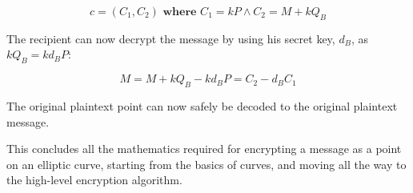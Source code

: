\begin{equation}
	c = (C_1, C_2)  \textbf{ where }  C_1 = kP \land C_2 = M+kQ_B
\end{equation}

The recipient can now decrypt the message by using his secret key, \(d_B\), as \(kQ_B = kd_BP\):

\begin{equation}
	M = M + k Q_B - k d_B P = C_2 - d_B C_1
\end{equation}

The original plaintext point can now safely be decoded to the original plaintext message.\cite{hankerson2010}

This concludes all the mathematics required for encrypting a message as a point on an elliptic curve, starting from
the basics of curves, and moving all the way to the high-level encryption algorithm.